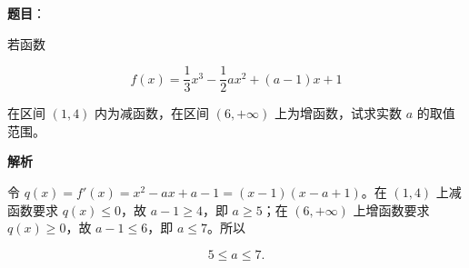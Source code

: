 \begin{answer}

\textbf{题目}：

若函数

\nopagebreak[4]
\[
f(x)=\frac13x^3-\frac12ax^2+(a-1)x+1
\]

在区间 $(1,4)$ 内为减函数，在区间 $(6,+\infty)$ 上为增函数，试求实数 $a$ 的取值范围。

\textbf{解析}

令 $q(x)=f'(x)=x^2-ax+a-1=(x-1)(x-a+1)$。在 $(1,4)$ 上减函数要求 $q(x)\leqslant0$，故 $a-1\geqslant4$，即 $a\geqslant5$；在 $(6,+\infty)$ 上增函数要求 $q(x)\geqslant0$，故 $a-1\leqslant6$，即 $a\leqslant7$。所以

\nopagebreak[4]
\[
5\leqslant a\leqslant7.
\]


\end{answer}
